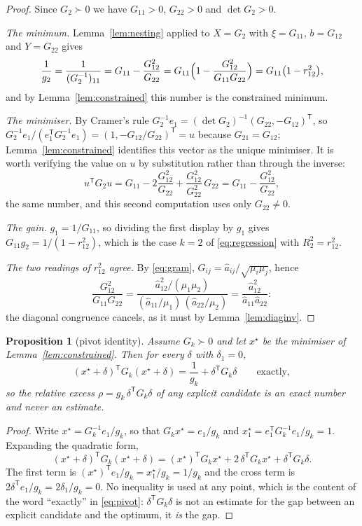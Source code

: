 \documentclass[11pt,a4paper]{article}
\theoremstyle{plain}
\newtheorem{proposition}[theorem]{Proposition}
\theoremstyle{definition}
\newcommand{\T}{\mathsf{T}}
\newcommand{\PD}{\succ 0}
\newcommand{\ah}{\widehat{a}}
\begin{document}
\begin{proof}
Since $G_2\PD$ we have $G_{11}>0$, $G_{22}>0$ and $\det G_2>0$.

\emph{The minimum.} Lemma~\ref{lem:nesting} applied to $X=G_2$ with
$\xi=G_{11}$, $b=G_{12}$ and $Y=G_{22}$ gives
\[
  \frac1{g_2}=\frac1{(G_2^{-1})_{11}}=G_{11}-\frac{G_{12}^{2}}{G_{22}}
  =G_{11}\Bigl(1-\frac{G_{12}^{2}}{G_{11}G_{22}}\Bigr)
  =G_{11}\bigl(1-r_{12}^{2}\bigr),
\]
and by Lemma~\ref{lem:constrained} this number is the constrained minimum.

\emph{The minimiser.} By Cramer's rule
$G_2^{-1}e_1=(\det G_2)^{-1}(G_{22},-G_{12})^{\T}$, so
$G_2^{-1}e_1/(e_1^{\T}G_2^{-1}e_1)=(1,-G_{12}/G_{22})^{\T}=u$ because
$G_{21}=G_{12}$; Lemma~\ref{lem:constrained} identifies this vector as the
unique minimiser. It is worth verifying the value on $u$ by substitution rather
than through the inverse:
\[
  u^{\T}G_2u=G_{11}-2\frac{G_{12}^{2}}{G_{22}}
  +\frac{G_{12}^{2}}{G_{22}^{2}}\,G_{22}
  =G_{11}-\frac{G_{12}^{2}}{G_{22}},
\]
the same number, and this second computation uses only $G_{22}\ne0$.

\emph{The gain.} $g_1=1/G_{11}$, so dividing the first display by $g_1$ gives
$G_{11}g_2=1/(1-r_{12}^{2})$, which is the case $k=2$ of
\eqref{eq:regression} with $R_2^{2}=r_{12}^{2}$.

\emph{The two readings of $r_{12}^{2}$ agree.} By \eqref{eq:gram},
$G_{ij}=\ah_{ij}/\sqrt{\mu_i\mu_j}$, hence
\[
  \frac{G_{12}^{2}}{G_{11}G_{22}}
  =\frac{\ah_{12}^{2}/(\mu_1\mu_2)}
        {(\ah_{11}/\mu_1)\,(\ah_{22}/\mu_2)}
  =\frac{\ah_{12}^{2}}{\ah_{11}\ah_{22}} :
\]
the diagonal congruence cancels, as it must by Lemma~\ref{lem:diaginv}.
\end{proof}

\begin{proposition}[pivot identity]
\label{prop:pivot}
Assume $G_k\PD$ and let $x^{\star}$ be the minimiser of
Lemma~\ref{lem:constrained}. Then for every $\delta$ with $\delta_1=0$,
\begin{equation}
\label{eq:pivot}
  (x^{\star}+\delta)^{\T}G_k(x^{\star}+\delta)
  =\frac1{g_k}+\delta^{\T}G_k\delta
  \qquad\text{exactly},
\end{equation}
so the relative excess $\rho=g_k\,\delta^{\T}G_k\delta$ of any explicit
candidate is an exact number and never an estimate.
\end{proposition}

\begin{proof}
Write $x^{\star}=G_k^{-1}e_1/g_k$, so that $G_kx^{\star}=e_1/g_k$ and
$x^{\star}_1=e_1^{\T}G_k^{-1}e_1/g_k=1$. Expanding the quadratic form,
\[
  (x^{\star}+\delta)^{\T}G_k(x^{\star}+\delta)
  =(x^{\star})^{\T}G_kx^{\star}+2\,\delta^{\T}G_kx^{\star}
  +\delta^{\T}G_k\delta .
\]
The first term is $(x^{\star})^{\T}e_1/g_k=x^{\star}_1/g_k=1/g_k$ and the
cross term is $2\delta^{\T}e_1/g_k=2\delta_1/g_k=0$. No inequality is used at
any point, which is the content of the word ``exactly'' in \eqref{eq:pivot}:
$\delta^{\T}G_k\delta$ is not an estimate for the gap between an explicit
candidate and the optimum, it \emph{is} the gap.
\end{proof}
\end{document}

